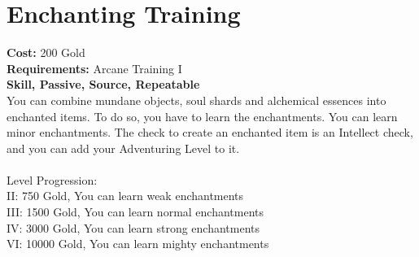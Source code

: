\section{Enchanting Training}
\textbf{Cost:} 200 Gold\\
\textbf{Requirements:} Arcane Training I\\
\textbf{Skill, Passive, Source, Repeatable}\\
You can combine mundane objects, soul shards and alchemical essences into enchanted items. To do so, you have to learn the enchantments. You can learn minor enchantments. The check to create an enchanted item is an Intellect check, and you can add your Adventuring Level to it.\\
\\
Level Progression:\\
II: 750 Gold, You can learn weak enchantments\\
III: 1500 Gold, You can learn normal enchantments\\
IV: 3000 Gold, You can learn strong enchantments\\
VI: 10000 Gold, You can learn mighty enchantments\\
